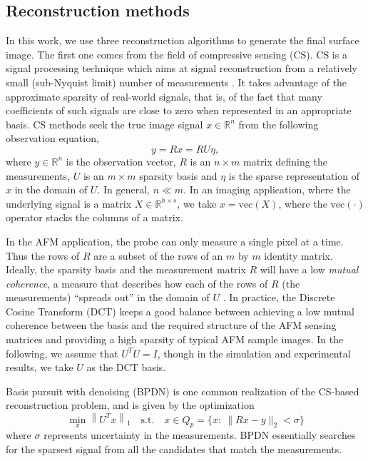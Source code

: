 \documentclass[twocolumn,twoside]{IEEEtran/IEEEtran}
\begin{document}
\subsection{Reconstruction methods}
\label{sec:reconstructionMethods}
	
In this work, we use three reconstruction algorithms to generate the final
surface image. The first one comes from the field of compressive sensing (CS).
CS is a signal processing technique which aims at signal reconstruction from a
relatively small (sub-Nyquist limit) number of measurements
\cite{carmi2014compressive}. It takes advantage of the approximate sparsity of
real-world signals, that is, of the fact that many coefficients of such signals
are close to zero when represented in an appropriate basis. CS methods seek the
true image signal $x\in\mathbb{R}^n$ from the following observation equation,
\begin{equation}\label{op:observation}
  y = R x = RU\eta,
\end{equation}
\noindent where $y\in\mathbb{R}^n$ is the observation vector, $R$ is an
$n\times m$ matrix defining the measurements, $U$ is an $m\times m$ sparsity
basis and $\eta$ is the sparse representation of $x$ in the domain of $U$. In
general, $n\ll m$. In an imaging application, where the underlying signal is a
matrix $X\in\mathbb{R}^{h\times s}$, we take $x=\text{vec}(X)$, where the
$\text{vec}(\cdot)$ operator stacks the columns of a matrix.

	
In the AFM application, the probe can only measure a single pixel at a time.
Thus the rows of $R$ are a subset of the rows of an $m$ by $m$ identity matrix.
Ideally, the sparsity basis and
the measurement matrix $R$ will have a low \textit{mutual coherence}, a
measure that describes how each of the rows of $R$ (the measurements)
``spreads out'' in the domain of $U$ \cite{candes2007sparsity}. In practice,
the Discrete Cosine Transform (DCT) keeps a good balance between achieving a low
mutual coherence between the basis and the required structure of the AFM sensing
matrices and providing a high sparsity of typical AFM sample images. In the following,
we assume that $U^TU=I$, though in the simulation and experimental results, we take
$U$ as the DCT basis.
	
Basis pursuit with denoising (BPDN) is one common realization of the CS-based
reconstruction problem, and is given by the optimization
\begin{equation}
  \min_{x} \left \| U^Tx \right \|_1 \quad
  \text{s.t.}\quad x\in Q_p = \{x:~\|Rx - y\|_2 < \sigma\} \label{op:bp}
\end{equation}
where $\sigma$ represents uncertainty in the measurements. BPDN
essentially searches for the sparsest signal from all
the candidates that match the measurements.
\end{document}
